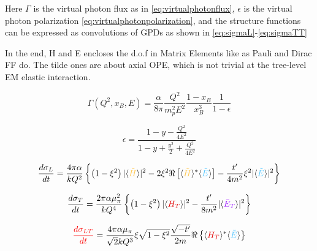     Here $\Gamma$ is the virtual photon flux as in \eqref{eq:virtualphotonflux}, $\epsilon$ is the virtual photon polarization \eqref{eq:virtualphotonpolarization}, and the structure functions can be expressed as convolutions of GPDs as shown in \eqref{eq:sigmaL}-\eqref{eq:sigmaTT}

In the end, H and E encloses the d.o.f in Matrix Elements like as Pauli and Dirac FF do. The tilde ones are about axial OPE, which is not trivial at the tree-level EM elastic interaction. 

    \begin{equation}\label{eq:virtualphotonflux}
                 \Gamma (Q^2, x_B, E) = \frac{\alpha}{8\pi} \frac{Q^2}{m^2_pE^2}\frac{1-x_B}{x_B^3}\frac{1}{1-\epsilon}
    \end{equation}

    \begin{equation}\label{eq:virtualphotonpolarization}
        \epsilon = \frac{1 - y - \frac{Q^2}{4E^2}}{1 - y + \frac{y^2}{2} + \frac{Q^2}{4E^2}}
    \end{equation}\label{Virtual Photon Polarization}

 \begin{equation}\label{eq:sigmaL}
         \textcolor{sigmaL}{\frac{d\sigma_{L}}{dt}} = 
        \frac{4\pi\alpha}{kQ^2}\left\{ \left( 1 - \xi^2 \right) 
        \lvert \langle \GPDHtildeEQ \rangle \rvert ^2 
        -2\xi^2 \Re \left[  \langle \GPDHtildeEQ \rangle ^* \langle \GPDEtildeEQ \rangle    \right] - \frac{t'}{4m^2}\xi^2
        \lvert \langle \GPDEtildeEQ \rangle \rvert ^2  \right\}
    \end{equation} 

    \begin{equation}\label{eq:sigmaT}
        \textcolor{sigmaT}{\frac{d\sigma_{T}}{dt}} = 
        \frac{2\pi\alpha \mu_{\pi}^2}{kQ^4}
        \left\{ \left( 1 - \xi^2 \right) 
        \lvert \langle \GPDHTEQ \rangle \rvert ^2
        - \frac{t'}{8m^2}
        \lvert \langle \GPDETbarEQ \rangle \rvert ^2  \right\}    
    \end{equation} 
    
    \begin{equation}\label{eq:sigmaLT}
        \textcolor{sigmaLT}{\frac{d\sigma_{LT}}{dt}} = 
        \frac{4\pi\alpha \mu_{\pi}}{\sqrt{2}kQ^3}
        \xi\sqrt{1-\xi^2}
        \frac{\sqrt{-t'}}{2m}
        \Re \left\{ 
         \langle \GPDHTEQ \rangle ^*
        \langle \GPDEtildeEQ \rangle   
        \right\}
     \end{equation} 
    
